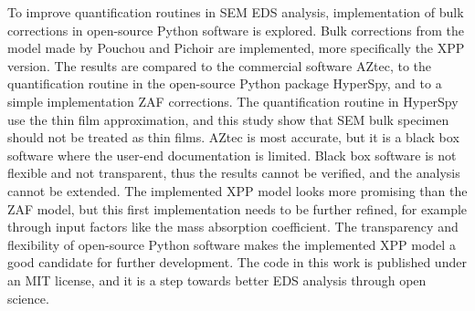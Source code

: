 To improve quantification routines in SEM EDS analysis, implementation of bulk corrections in open-source Python software is explored.
Bulk corrections from the model made by Pouchou and Pichoir are implemented, more specifically the XPP version.
The results are compared to the commercial software AZtec, to the quantification routine in the open-source Python package HyperSpy, and to a simple implementation ZAF corrections.
The quantification routine in HyperSpy use the thin film approximation, and this study show that SEM bulk specimen should not be treated as thin films.
AZtec is most accurate, but it is a black box software where the user-end documentation is limited.
Black box software is not flexible and not transparent, thus the results cannot be verified, and the analysis cannot be extended.
The implemented XPP model looks more promising than the ZAF model, but this first implementation needs to be further refined, for example through input factors like the mass absorption coefficient. %
The transparency and flexibility of open-source Python software makes the implemented XPP model a good candidate for further development.
The code in this work is published under an MIT license, and it is a step towards better EDS analysis through open science.



